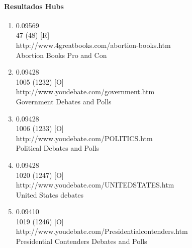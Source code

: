 \paragraph{Resultados Hubs}
\begin{enumerate}
\item
0.09569\\
47 (48) [R]\\
http://www.4greatbooks.com/abortion-books.htm\\
Abortion Books Pro and Con\\

\item
0.09428\\
1005 (1232) [O]\\
http://www.youdebate.com/government.htm\\
Government Debates and Polls\\

\item
0.09428\\
1006 (1233) [O]\\
http://www.youdebate.com/POLITICS.htm\\
Political Debates and Polls\\

\item
0.09428\\
1020 (1247) [O]\\
http://www.youdebate.com/UNITEDSTATES.htm\\
United States debates\\

\item
0.09410\\
1019 (1246) [O]\\
http://www.youdebate.com/Presidentialcontenders.htm\\
Presidential Contenders Debates and Polls\\

\end{enumerate}




